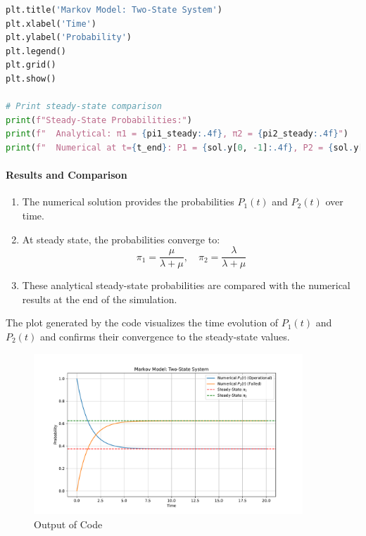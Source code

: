 \documentclass[a4paper,12pt]{article}
\begin{document}
\begin{answerbox}
	
	
\begin{lstlisting}[language=Python, caption=Numerical Solution for Two-State Markov Model]
plt.title('Markov Model: Two-State System')
plt.xlabel('Time')
plt.ylabel('Probability')
plt.legend()
plt.grid()
plt.show()

# Print steady-state comparison
print(f"Steady-State Probabilities:")
print(f"  Analytical: π1 = {pi1_steady:.4f}, π2 = {pi2_steady:.4f}")
print(f"  Numerical at t={t_end}: P1 = {sol.y[0, -1]:.4f}, P2 = {sol.y[1, -1]:.4f}")
\end{lstlisting}




\paragraph{Results and Comparison}
\begin{enumerate}
	\item The numerical solution provides the probabilities \( P_1(t) \) and \( P_2(t) \) over time.
	
	\item At steady state, the probabilities converge to:
	\[
	\pi_1 = \frac{\mu}{\lambda + \mu}, \quad \pi_2 = \frac{\lambda}{\lambda + \mu}
	\]
	
	\item These analytical steady-state probabilities are compared with the numerical results at the end of the simulation.
\end{enumerate}
The plot generated by the code visualizes the time evolution of \( P_1(t) \) and \( P_2(t) \) and confirms their convergence to the steady-state values.
\end{answerbox}

\begin{figure}[h!]
	\centering
	\includegraphics[width=0.9\textwidth]{Images/Figure_1.pdf} 
	\caption{Output of Code}
	\label{fig:Output of Code}
\end{figure}
	
\end{document}
